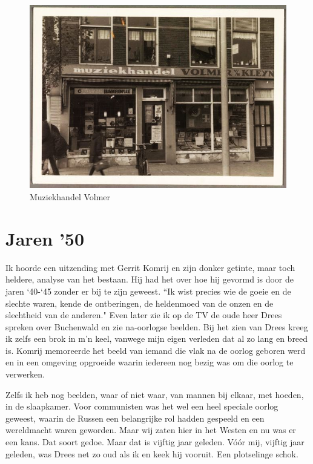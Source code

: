 \documentclass[10pt,twoside, openright]{memoir}
\begin{document}
\begin{figure}
\includegraphics[width=\textwidth]{img/97volmer}
\caption*{\footnotesize Muziekhandel Volmer}
\end{figure}


\section{Jaren '50} %
\label{cha:jaren50}

Ik hoorde een uitzending met Gerrit Komrij en zijn donker getinte, maar toch heldere, analyse van het bestaan. Hij had het over hoe hij gevormd is door de jaren `40-`45 zonder er bij te zijn geweest. ``Ik wist precies wie de goeie en de slechte waren, kende de ontberingen, de heldenmoed van de onzen en de slechtheid van de anderen." Even later zie ik op de TV de oude heer Drees spreken over Buchenwald en zie na-oorlogse beelden. Bij het zien van Drees kreeg ik zelfs een brok in m’n keel, vanwege mijn eigen verleden dat al zo lang en breed is. Komrij memoreerde het beeld van iemand die vlak na de oorlog geboren werd en in een omgeving opgroeide waarin iedereen nog bezig was om die oorlog te verwerken. 

Zelfs ik heb nog beelden, waar of niet waar, van mannen bij elkaar, met hoeden, in de slaapkamer. Voor communisten was het wel een heel speciale oorlog geweest, waarin de Russen een belangrijke rol hadden gespeeld en een wereldmacht waren geworden. Maar wij zaten hier in het Westen en nu was er een kans. Dat soort gedoe. Maar dat is vijftig jaar geleden. Vóór mij, vijftig jaar geleden, was Drees net zo oud als ik en keek hij vooruit. Een plotselinge schok.
\end{document}
